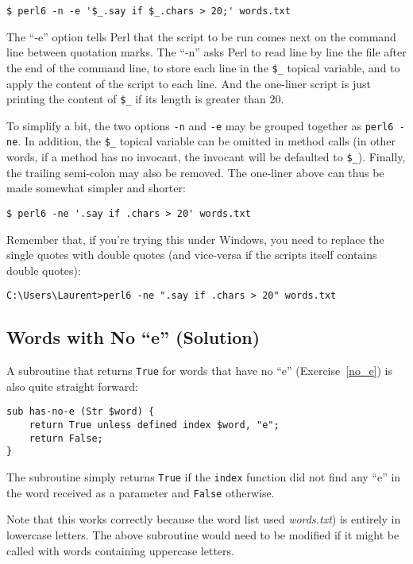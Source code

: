 \begin{verbatim}
$ perl6 -n -e '$_.say if $_.chars > 20;' words.txt
\end{verbatim} 
%
The ``-e'' option tells Perl that the script to be run 
comes next on the command line between quotation marks. The 
``-n'' asks Perl to read line by line the file after the 
end of the command line, to store each line in the \verb'$_' 
topical variable, and to apply the content of the script to 
each line. And the one-liner script is just printing the 
content of \verb'$_' if its length is greater than 20.

To simplify a bit, the two options \verb'-n' and \verb'-e' 
may be grouped together as \verb"perl6 -ne". In addition, 
the \verb'$_' topical variable can be omitted in method calls 
(in other words, if a method has no invocant, the invocant 
will be defaulted to \verb'$_'). Finally, the trailing 
semi-colon may also be removed. The one-liner above can 
thus be made somewhat simpler and shorter:

\begin{verbatim}
$ perl6 -ne '.say if .chars > 20' words.txt
\end{verbatim} 
%
Remember that, if you're trying this under Windows, you need to 
replace the single quotes with double quotes (and vice-versa if 
the scripts itself contains double quotes):

\begin{verbatim}
C:\Users\Laurent>perl6 -ne ".say if .chars > 20" words.txt
\end{verbatim} 
%

\subsection{Words with No ``e'' (Solution)}

A subroutine that returns {\tt True} for words that have 
no ``e'' (Exercise~\ref{no_e}) is also quite straight forward:

\begin{verbatim}
sub has-no-e (Str $word) {
    return True unless defined index $word, "e";
    return False;
}
\end{verbatim}
%

The subroutine simply returns {\tt True} if the {\tt index} 
function did not find any ``e'' in the word received as 
a parameter and {\tt False} otherwise. 

Note that this works correctly because the word list used 
\emph{words.txt}) is entirely in lowercase letters. The 
above subroutine would need to be modified if it might 
be called with words containing uppercase letters. 


